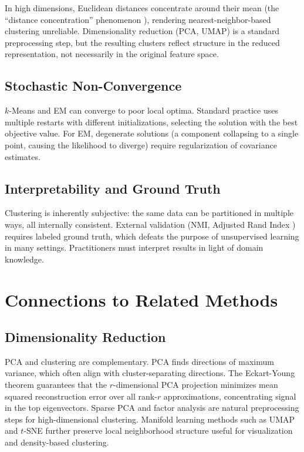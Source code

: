 \documentclass[conference]{IEEEtran}
\begin{document}
In high dimensions, Euclidean distances concentrate around their mean (the ``distance concentration'' phenomenon \cite{beyer1999nearest}), rendering nearest-neighbor-based clustering unreliable. Dimensionality reduction (PCA, UMAP) is a standard preprocessing step, but the resulting clusters reflect structure in the reduced representation, not necessarily in the original feature space.

\subsection{Stochastic Non-Convergence}

$k$-Means and EM can converge to poor local optima. Standard practice uses multiple restarts with different initializations, selecting the solution with the best objective value. For EM, degenerate solutions (a component collapsing to a single point, causing the likelihood to diverge) require regularization of covariance estimates.

\subsection{Interpretability and Ground Truth}

Clustering is inherently subjective: the same data can be partitioned in multiple ways, all internally consistent. External validation (NMI, Adjusted Rand Index \cite{hubert1985comparing}) requires labeled ground truth, which defeats the purpose of unsupervised learning in many settings. Practitioners must interpret results in light of domain knowledge.

\section{Connections to Related Methods}
\label{sec:connections}

\subsection{Dimensionality Reduction}

PCA and clustering are complementary. PCA finds directions of maximum variance, which often align with cluster-separating directions. The Eckart-Young theorem guarantees that the $r$-dimensional PCA projection minimizes mean squared reconstruction error over all rank-$r$ approximations, concentrating signal in the top eigenvectors. Sparse PCA and factor analysis are natural preprocessing steps for high-dimensional clustering. Manifold learning methods such as UMAP \cite{mcinnes2018umap} and $t$-SNE \cite{van2008visualizing} further preserve local neighborhood structure useful for visualization and density-based clustering.
\end{document}
